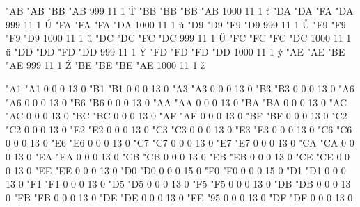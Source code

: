 \setcharcode  "AB  "AB  "BB  "AB   999  11  1  \texaccent \v T
\setcharcode  "BB  "BB  "BB  "AB  1000  11  1  \texaccent \v t
\setcharcode  "DA  "DA  "FA  "DA   999  11  1  \texaccent \'U
\setcharcode  "FA  "FA  "FA  "DA  1000  11  1  \texaccent \'u
\setcharcode  "D9  "D9  "F9  "D9   999  11  1  \texaccent \r U
\setcharcode  "F9  "F9  "F9  "D9  1000  11  1  \texaccent \r u
\setcharcode  "DC  "DC  "FC  "DC   999  11  1  \texaccent \"U
\setcharcode  "FC  "FC  "FC  "DC  1000  11  1  \texaccent \"u
\setcharcode  "DD  "DD  "FD  "DD   999  11  1  \texaccent \'Y
\setcharcode  "FD  "FD  "FD  "DD  1000  11  1  \texaccent \'y
\setcharcode  "AE  "AE  "BE  "AE   999  11  1  \texaccent \v Z
\setcharcode  "BE  "BE  "BE  "AE  1000  11  1  \texaccent \v z

\setcharcode  "A1  "A1    0    0     0  13  0  
\setcharcode  "B1  "B1    0    0     0  13  0  
\setcharcode  "A3  "A3    0    0     0  13  0  \expandto {\L}
\setcharcode  "B3  "B3    0    0     0  13  0  \expandto {\l}
\setcharcode  "A6  "A6    0    0     0  13  0  
\setcharcode  "B6  "B6    0    0     0  13  0  
\setcharcode  "AA  "AA    0    0     0  13  0  
\setcharcode  "BA  "BA    0    0     0  13  0  
\setcharcode  "AC  "AC    0    0     0  13  0  
\setcharcode  "BC  "BC    0    0     0  13  0  
\setcharcode  "AF  "AF    0    0     0  13  0  
\setcharcode  "BF  "BF    0    0     0  13  0  
\setcharcode  "C2  "C2    0    0     0  13  0  
\setcharcode  "E2  "E2    0    0     0  13  0  
\setcharcode  "C3  "C3    0    0     0  13  0  
\setcharcode  "E3  "E3    0    0     0  13  0  
\setcharcode  "C6  "C6    0    0     0  13  0  
\setcharcode  "E6  "E6    0    0     0  13  0  
\setcharcode  "C7  "C7    0    0     0  13  0  
\setcharcode  "E7  "E7    0    0     0  13  0  
\setcharcode  "CA  "CA    0    0     0  13  0  
\setcharcode  "EA  "EA    0    0     0  13  0  
\setcharcode  "CB  "CB    0    0     0  13  0  
\setcharcode  "EB  "EB    0    0     0  13  0  
\setcharcode  "CE  "CE    0    0     0  13  0  
\setcharcode  "EE  "EE    0    0     0  13  0  \expandto {\^\i}
\setcharcode  "D0  "D0    0    0     0  15  0  %
\setcharcode  "F0  "F0    0    0     0  15  0  %
\setcharcode  "D1  "D1    0    0     0  13  0  
\setcharcode  "F1  "F1    0    0     0  13  0  
\setcharcode  "D5  "D5    0    0     0  13  0  
\setcharcode  "F5  "F5    0    0     0  13  0  
\setcharcode  "DB  "DB    0    0     0  13  0  
\setcharcode  "FB  "FB    0    0     0  13  0  
\setcharcode  "DE  "DE    0    0     0  13  0  
\setcharcode  "FE  "95    0    0     0  13  0   %
\setcharcode  "DF  "DF    0    0     0  13  0  \expandto {\ss}

